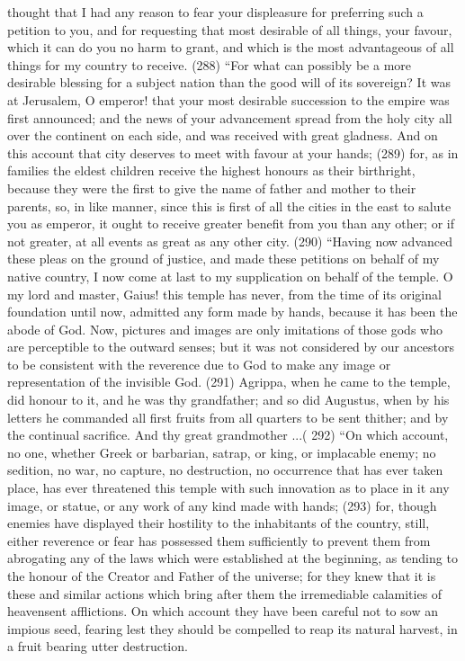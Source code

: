 thought that I had any reason to fear your displeasure for preferring such a petition to you, and for
requesting that most desirable of all things, your favour, which it can do you no harm to grant, and
which is the most advantageous of all things for my country to receive. (288) ``For what can
possibly be a more desirable blessing for a subject nation than the good will of its sovereign? It
was at Jerusalem, O emperor! that your most desirable succession to the empire was first
announced; and the news of your advancement spread from the holy city all over the continent on
each side, and was received with great gladness. And on this account that city deserves to meet
with favour at your hands; (289) for, as in families the eldest children receive the highest honours
as their birthright, because they were the first to give the name of father and mother to their
parents, so, in like manner, since this is first of all the cities in the east to salute you as emperor, it
ought to receive greater benefit from you than any other; or if not greater, at all events as great as
any other city. (290) ``Having now advanced these pleas on the ground of justice, and made these
petitions on behalf of my native country, I now come at last to my supplication on behalf of the
temple. O my lord and master, Gaius! this temple has never, from the time of its original foundation
until now, admitted any form made by hands, because it has been the abode of God. Now, pictures
and images are only imitations of those gods who are perceptible to the outward senses; but it was
not considered by our ancestors to be consistent with the reverence due to God to make any
image or representation of the invisible God. (291) Agrippa, when he came to the temple, did
honour to it, and he was thy grandfather; and so did Augustus, when by his letters he commanded
all first fruits from all quarters to be sent thither; and by the continual sacrifice. And thy great
grandmother ...( 292) ``On which account, no one, whether Greek or barbarian, satrap, or king, or
implacable enemy; no sedition, no war, no capture, no destruction, no occurrence that has ever
taken place, has ever threatened this temple with such innovation as to place in it any image, or
statue, or any work of any kind made with hands; (293) for, though enemies have displayed their
hostility to the inhabitants of the country, still, either reverence or fear has possessed them
sufficiently to prevent them from abrogating any of the laws which were established at the
beginning, as tending to the honour of the Creator and Father of the universe; for they knew that it
is these and similar actions which bring after them the irremediable calamities of heavensent
afflictions. On which account they have been careful not to sow an impious seed, fearing lest they
should be compelled to reap its natural harvest, in a fruit bearing utter destruction.

